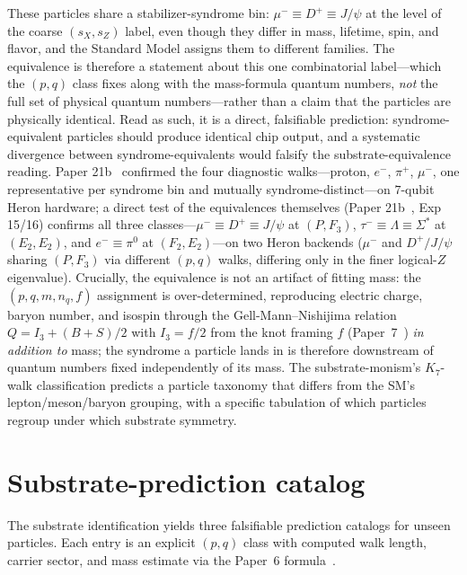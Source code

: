 \documentclass[11pt]{article}
\begin{document}
These particles share a stabilizer-syndrome bin: $\mu^- \equiv D^+ \equiv J/\psi$ at the level of the coarse $(s_X, s_Z)$ label, even though they differ in mass, lifetime, spin, and flavor, and the Standard Model assigns them to different families.  The equivalence is therefore a statement about this one combinatorial label---which the $(p, q)$ class fixes along with the mass-formula quantum numbers, \emph{not} the full set of physical quantum numbers---rather than a claim that the particles are physically identical.  Read as such, it is a direct, falsifiable prediction: syndrome-equivalent particles should produce identical chip output, and a systematic divergence between syndrome-equivalents would falsify the substrate-equivalence reading.  Paper 21b~\cite{Paper21b} confirmed the four diagnostic walks---proton, $e^-$, $\pi^+$, $\mu^-$, one representative per syndrome bin and mutually syndrome-distinct---on $7$-qubit Heron hardware; a direct test of the equivalences themselves (Paper 21b~\cite{Paper21b}, Exp 15/16) confirms all three classes---$\mu^- \equiv D^+ \equiv J/\psi$ at $(P, F_3)$, $\tau^- \equiv \Lambda \equiv \Sigma^*$ at $(E_2, E_2)$, and $e^- \equiv \pi^0$ at $(F_2, E_2)$---on two Heron backends ($\mu^-$ and $D^+\!/J\!/\psi$ sharing $(P, F_3)$ via different $(p, q)$ walks, differing only in the finer logical-$Z$ eigenvalue).  Crucially, the equivalence is not an artifact of fitting mass: the $(p, q, m, n_q, f)$ assignment is over-determined, reproducing electric charge, baryon number, and isospin through the Gell-Mann--Nishijima relation $Q = I_3 + (B + S)/2$ with $I_3 = f/2$ from the knot framing $f$ (Paper~7~\cite{Paper7}) \emph{in addition to} mass; the syndrome a particle lands in is therefore downstream of quantum numbers fixed independently of its mass.  The substrate-monism's $K_7$-walk classification predicts a particle taxonomy that differs from the SM's lepton/meson/baryon grouping, with a specific tabulation of which particles regroup under which substrate symmetry.

\section{Substrate-prediction catalog}
\label{sec:prediction-catalog}

The substrate identification yields three falsifiable prediction catalogs for unseen particles.  Each entry is an explicit $(p, q)$ class with computed walk length, carrier sector, and mass estimate via the Paper~6 formula~\cite{Paper6}.
\end{document}
